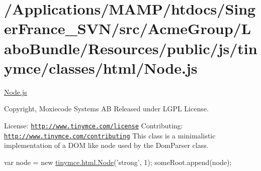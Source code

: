 \hypertarget{_2_applications_2_m_a_m_p_2htdocs_2_singer_france__s_v_n_2src_2_acme_group_2_labo_bundle_2_resou3ee1d357c72aada161ec9576f416035e}{\section{/\+Applications/\+M\+A\+M\+P/htdocs/\+Singer\+France\+\_\+\+S\+V\+N/src/\+Acme\+Group/\+Labo\+Bundle/\+Resources/public/js/tinymce/classes/html/\+Node.\+js}
}
\hyperlink{_node_8js}{Node.\+js}

Copyright, Moxiecode Systems A\+B Released under L\+G\+P\+L License.

License\+: \href{http://www.tinymce.com/license}{\tt http\+://www.\+tinymce.\+com/license} Contributing\+: \href{http://www.tinymce.com/contributing}{\tt http\+://www.\+tinymce.\+com/contributing} This class is a minimalistic implementation of a D\+O\+M like node used by the Dom\+Parser class.

var node = new \hyperlink{classtinymce_1_1html_1_1_node}{tinymce.\+html.\+Node}('strong', 1); some\+Root.\+append(node);


\begin{DoxyCodeInclude}
\end{DoxyCodeInclude}
 